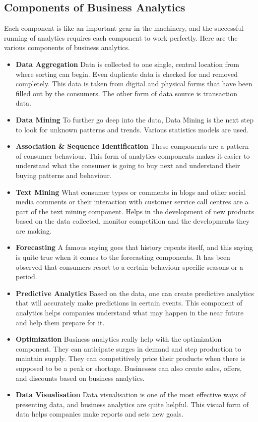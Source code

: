 \documentclass{article}
\begin{document}
\begin{multicols}{2}
\subsection{Components of Business Analytics}
Each component is like an important gear in the machinery, and the successful running of analytics requires each component to work perfectly. Here are the various components of business analytics.
\begin{itemize}
\item \textbf{Data Aggregation}
Data is collected to one single, central location from where sorting can begin. Even duplicate data is checked for and removed completely. 
This data is taken from digital and physical forms that have been filled out by the consumers. The other form of data source is transaction data. 
\item \textbf{Data Mining}
To further go deep into the data, Data Mining is the next step to look for unknown patterns and trends.
Various statistics models are used.
\item \textbf{Association & Sequence Identification}
These components are a pattern of consumer behaviour.
This form of analytics components makes it easier to understand what the consumer is going to buy next and understand their buying patterns and behaviour.
\item \textbf{Text Mining}
What consumer types or comments in blogs and other social media comments or their interaction with customer service call centres are a part of the text mining component.
Helps in the development of new products based on the data collected, monitor competition and the developments they are making.
\item \textbf{Forecasting}
A famous saying goes that history repeats itself, and this saying is quite true when it comes to the forecasting components. It has been observed that consumers resort to a certain behaviour specific seasons or a period.
\item \textbf{Predictive Analytics}
Based on the data, one can create predictive analytics that will accurately make predictions in certain events.
This component of analytics helps companies understand what may happen in the near future and help them prepare for it.
\item \textbf{Optimization}
Business analytics really help with the optimization component. They can anticipate surges in demand and step production to maintain supply. They can competitively price their products when there is supposed to be a peak or shortage. Businesses can also create sales, offers, and discounts based on business analytics.
\item \textbf{Data Visualisation}
Data visualisation is one of the most effective ways of presenting data, and business analytics are quite helpful. This visual form of data helps companies make reports and sets new goals. 
\end{itemize}



\end{multicols}
\end{document}
